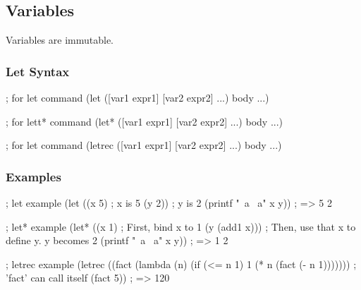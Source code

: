 \subsection{Variables}

Variables are immutable.

\subsubsection{Let Syntax}

\begin{racketcode}
; for let command
(let ([var1 expr1] [var2 expr2] ...) body ...)

; for lett* command
(let* ([var1 expr1] [var2 expr2] ...) body ...)

; for let command
(letrec ([var1 expr1] [var2 expr2] ...) body ...)
\end{racketcode}

\subsubsection{Examples}

\begin{racketcode}
; let example
(let ((x 5)      ; x is 5
      (y 2))     ; y is 2
  (printf "~a ~a\n" x y)) ; => 5 2

; let* example
(let* ((x 1)           ; First, bind x to 1
       (y (add1 x)))   ; Then, use that x to define y. y becomes 2
  (printf "~a ~a\n" x y)) ; => 1 2

; letrec example
(letrec ((fact (lambda (n)
                 (if (<= n 1)
                     1
                     (* n (fact (- n 1))))))) ; 'fact' can call itself
  (fact 5)) ; => 120
\end{racketcode}

